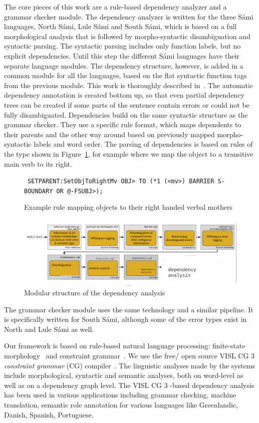 \documentclass[free]{flammie}
\begin{document}
The core pieces of this work are a rule-based dependency analyzer and a grammar
checker module.  The dependency analyzer is written for the three Sámi
languages, North Sámi, Lule Sámi and South Sámi, which is based on a full
morphological analysis that is followed by morpho-syntactic disambiguation and
syntactic parsing. The syntactic parsing includes only function labels, but no
explicit dependencies. Until this step the different Sámi languages have their
separate language modules. The dependency structure, however, is added in a
common module for all the languages, based on the flat syntactic function tags
from the previous module. This work is thoroughly described
in~\cite{antonsen-etal-2010-reusing}.  The automatic dependency annotation is
created bottom up, so that even partial dependency trees can be created if some
parts of the sentence contain errors or could not be fully disambiguated.
Dependencies build on the same syntactic structure as the grammar checker.  They
use a specific rule format, which maps dependents to their parents and the other
way around based on previously mapped morpho-syntactic labels and word order.
The parsing of dependencies is based on rules of the type shown in
Figure~\ref{fig:dependency}, for example where we map the object to a transitive
main verb to its right.


\begin{figure}
{\texttt{%
SETPARENT:SetObjToRightMv OBJ> TO (*1 (<mv>) BARRIER S-BOUNDARY OR @-FSUBJ>);
}}
    \caption{Example rule mapping objects to their right handed verbal
    mothers\label{fig:dependency}}
\end{figure}

\begin{figure}
    \centering
    \includegraphics[width=.5\textwidth ]{syntaxflow.png}
    \caption{Modular structure of the dependency
    analysis\label{fig:dependencyflow}}
\end{figure}

The grammar checker module uses the same technology and a similar pipeline. It
is specifically written for South Sámi, although some of the error types exist
in North and Lule Sámi as well.

Our framework is based on rule-based natural language processing: finite-state
morphology~\cite{beesley2003finite} and constraint
grammar~\cite{karlsson1990constraint}.  We use the free/ open source VISL CG 3
\textit{constraint grammar} (CG) compiler~\cite{bick2015cg}.  The linguistic
analyses made by the systems include morphological, syntactic and semantic
analyses, both on word-level as well as on a dependency graph level.  The VISL
CG 3 -based dependency analysis has been used in various applications including
grammar checking, machine translation, semantic role annotation for various
languages like Greenlandic, Danish, Spanish,
Portuguese.~\cite{bick2019dependency,rademaker2017universal,bick2022modular}
\end{document}
